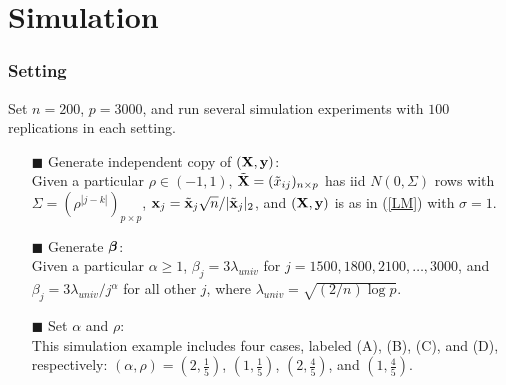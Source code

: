 \section{Simulation}
\begin{frame}
\sectionpage
\end{frame}


\begin{frame}
\frametitle{Setting}
\footnotesize
Set $n=200$, $p=3000$, and run several simulation experiments with
$100$ replications in each setting.
\begin{itemize}
\item[$\blacksquare$] Generate independent copy of $(\mbox{\bf X},\mbox{\bf y})$: \\
Given a particular $\rho \in(-1,1)$, $\tilde{\mbox{\bf X}} = (\tilde{x}_{ij})_{n\times p}$
has iid $N(0,\Sigma)$ rows with $\Sigma = (\rho^{|j-k|})_{p\times p}$,
$\mbox{\bf x}_j = \tilde{\mbox{\bf x}}_j\sqrt{n}/{|}\tilde{\mbox{\bf x}}_j{|}_2$, and $(\mbox{\bf X},\mbox{\bf y})$ is as in (\ref{LM}) with $\sigma=1$.
\item[$\blacksquare$] Generate $\mbox{\boldmath $\beta$}$: \\
Given a particular $\alpha \geq 1$, $\beta_j = 3\lambda_{univ}$ for $j = 1500, 1800, 2100, \ldots, 3000$,
and $\beta_j = 3\lambda_{univ}/j^\alpha$ for all other $j$, where $\lambda_{univ}=\sqrt{(2/n)\log p}$.
\item[$\blacksquare$] Set $\alpha$ and $\rho$: \\
This simulation example includes four cases, labeled (A), (B), (C), and (D), respectively:
$(\alpha,\rho)=(2,\frac{1}{5})$, $(1,\frac{1}{5})$, $(2,\frac{4}{5})$, and $(1,\frac{4}{5})$.
\end{itemize}
\end{frame}


